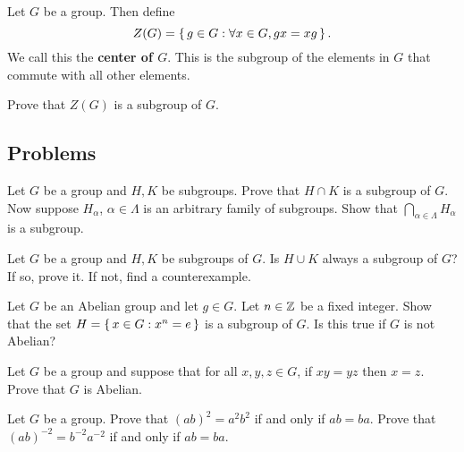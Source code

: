 \documentclass[./algebra-notes.tex]{subfiles}
\begin{document}
\begin{definition}
    Let $G$ be a group. Then define 
    \[
        Z(G) = \set{g \in G: \forall x \in G, gx = xg}.
    \]
    We call this the \textbf{center of $G$}. This is the subgroup of the
    elements in $G$ that commute with all other elements.
\end{definition}
\begin{exercise}
    Prove that $Z(G)$ is a subgroup of $G$.
\end{exercise}




\subsection{Problems}

\begin{exercise}
    Let $G$ be a group and $H, K$ be subgroups. Prove that $H \cap K$ is a
    subgroup of $G$. Now suppose $H_{\alpha}$, $\alpha \in \Lambda$ is an
    arbitrary family of subgroups. Show that $\bigcap_{\alpha \in \Lambda}
    H_\alpha$ is a subgroup.
\end{exercise}

\begin{exercise}
    Let $G$ be a group and $H, K$ be subgroups of $G$. Is $H \cup K$ always a
    subgroup of $G$? If so, prove it. If not, find a counterexample.
\end{exercise}

\begin{exercise}
    Let $G$ be an Abelian group and let $g \in G$. Let $n \in \mathbb{Z}$ be a fixed
    integer. Show that the set $H = \set{x \in G: x^n = e}$ is a subgroup of
    $G$. Is this true if $G$ is not Abelian?
\end{exercise}

\begin{exercise}
    Let $G$ be a group and suppose that for all $x,y,z \in G$, if $xy=yz$ then
    $x=z$. Prove that $G$ is Abelian.
\end{exercise}

\begin{exercise}
    Let $G$ be a group. Prove that $(ab)^2 = a^2 b^2$ if and only if $ab=ba$.
    Prove that $(ab)^{-2} = b^{-2} a^{-2}$ if and only if $ab=ba$.
    \autocite[Ex.~36, Ch~1, \pno~56]{Gallian_2020}
\end{exercise}
\end{document}
